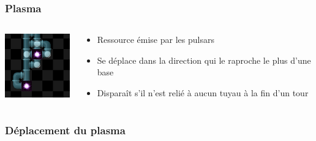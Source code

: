 \documentclass{beamer}
\begin{document}
\begin{frame}
	\frametitle{Plasma}
    \begin{columns}[T]
        \begin{column}{.3\textwidth}
            \includegraphics[width=3cm]{pictures/emission}
        \end{column}
        \begin{column}{.7\textwidth}
            \begin{itemize}
                \item Ressource émise par les pulsars
                \item Se déplace dans la direction qui le raproche le plus d'une base
                \item Disparaît s'il n'est relié à aucun tuyau à la fin d'un tour
            \end{itemize}
        \end{column}
    \end{columns}
\end{frame}

\begin{frame}
	\frametitle{Déplacement du plasma}
    \begin{columns}[T]
        \begin{column}{.5\textwidth}
             \\
        \end{column}
        \begin{column}{.5\textwidth}
             \\
        \end{column}
    \end{columns}
\end{frame}
\end{document}
